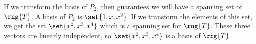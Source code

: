 If we transform the basis of $P_2$, then  guarantees we will have a spanning set of $\rng{T}$.  A basis of $P_2$ is $\set{1, x, x^2}$.  If we transform the elements of this set, we get the set $\set{x^2, x^3, x^4}$ which is a spanning set for $\rng{T}$.  These three vectors are linearly independent, so $\set{x^2, x^3, x^4}$ is a basis of $\rng{T}$.
